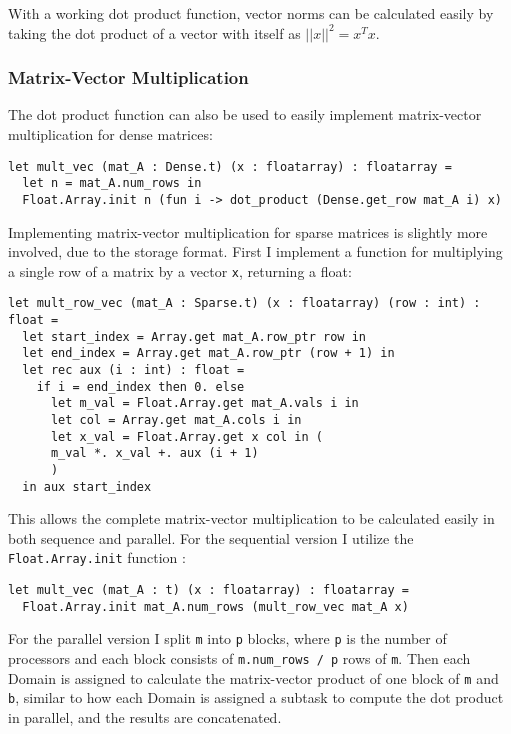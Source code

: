 \documentclass[pageno]{jpaper}
\begin{document}
\begin{doublespacing}
With a working dot product function, vector norms can be calculated easily by taking the dot product of a vector with itself as $||x||^2 = x^T x$.

\subsubsection{Matrix-Vector Multiplication}
The dot product function can also be used to easily implement matrix-vector multiplication for dense matrices:

\begin{verbatim}
let mult_vec (mat_A : Dense.t) (x : floatarray) : floatarray =
  let n = mat_A.num_rows in
  Float.Array.init n (fun i -> dot_product (Dense.get_row mat_A i) x)
\end{verbatim}

Implementing matrix-vector multiplication for sparse matrices is slightly more involved, due to the storage format. First I implement a function for multiplying a single row of a matrix by a vector \verb|x|, returning a float:

\begin{verbatim}
let mult_row_vec (mat_A : Sparse.t) (x : floatarray) (row : int) : float = 
  let start_index = Array.get mat_A.row_ptr row in
  let end_index = Array.get mat_A.row_ptr (row + 1) in
  let rec aux (i : int) : float =
    if i = end_index then 0. else
      let m_val = Float.Array.get mat_A.vals i in
      let col = Array.get mat_A.cols i in
      let x_val = Float.Array.get x col in (
      m_val *. x_val +. aux (i + 1)
      )
  in aux start_index
\end{verbatim}

This allows the complete matrix-vector multiplication to be calculated easily in both sequence and parallel. For the sequential version I utilize the \verb|Float.Array.init| function \cite{ocaml-docs-floatarray}:

\begin{verbatim}
let mult_vec (mat_A : t) (x : floatarray) : floatarray =
  Float.Array.init mat_A.num_rows (mult_row_vec mat_A x)
\end{verbatim}

For the parallel version I split \verb|m| into \verb|p| blocks, where \verb|p| is the number of processors and each block consists of \verb|m.num_rows / p| rows of \verb|m|. Then each Domain is assigned to calculate the matrix-vector product of one block of \verb|m| and \verb|b|, similar to how each Domain is assigned a subtask to compute the dot product in parallel, and the results are concatenated.


\end{doublespacing}
\end{document}
